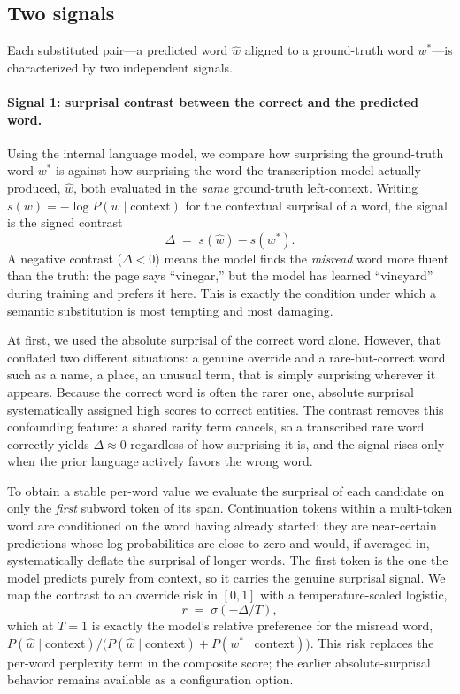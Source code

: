 \documentclass{anthology-ch}         %
\begin{document}
\subsection{Two signals}


Each substituted pair---a predicted word $\hat{w}$ aligned to a ground-truth
word $w^{*}$---is characterized by two independent signals.

\paragraph{Signal 1: surprisal contrast between the correct and the predicted word.}
Using the internal language model, we compare how surprising the ground-truth
word $w^{*}$ is against how surprising the word the transcription model actually
produced, $\hat{w}$, both evaluated in the \emph{same} ground-truth left-context.
Writing $s(w)=-\log P(w \mid \text{context})$ for the contextual surprisal of a
word, the signal is the signed contrast
\[
  \Delta \;=\; s(\hat{w}) - s(w^{*}).
\]
A negative contrast ($\Delta<0$) means the model finds the \emph{misread} word
more fluent than the truth: the page says ``vinegar,'' but the model has learned
``vineyard'' during training and prefers it here. This is exactly the condition
under which a semantic substitution is most tempting and most damaging.

At first, we used the absolute surprisal of the correct
word alone. However, that conflated two different situations: a genuine override and a
rare-but-correct word such as a name, a place, an unusual term, that is simply
surprising wherever it appears. Because the correct word is often the rarer one,
absolute surprisal systematically assigned high scores to correct entities. The
contrast removes this confounding feature: a shared rarity term cancels, so a transcribed rare word correctly yields $\Delta \approx 0$ regardless of how
surprising it is, and the signal rises only when the prior language actively favors the wrong word.

To obtain a stable per-word value we evaluate the surprisal of each candidate on
only the \emph{first} subword token of its span. Continuation tokens within a
multi-token word are conditioned on the word having already started; they are
near-certain predictions whose log-probabilities are close to zero and would, if
averaged in, systematically deflate the surprisal of longer words. The first
token is the one the model predicts purely from context, so it carries the
genuine surprisal signal. We map the contrast to an override risk in $[0,1]$ with
a temperature-scaled logistic,
\[
  r \;=\; \sigma\!\left(-\Delta / T\right),
\]
which at $T=1$ is exactly the model's relative preference for the misread word,
$P(\hat{w}\mid\text{context}) / \bigl(P(\hat{w}\mid\text{context}) +
P(w^{*}\mid\text{context})\bigr)$. This risk replaces the per-word perplexity
term in the composite score; the earlier absolute-surprisal behavior remains
available as a configuration option.
\end{document}
